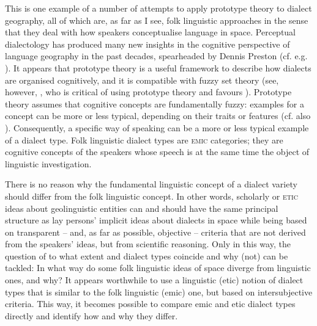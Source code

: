 \documentclass[output=paper]{LSP/langsci}
\begin{document}
This is one example of a number of attempts to apply prototype theory \citep{rosch_natural_1973,lakoff_women_1987} to dialect geography, all of which are, as far as I see, folk linguistic approaches \citep{christen_dialekt_1998,anders_was_2010,klausmann_wie_2006,kristiansen_style-shifting_2008,beeching_prototype-theoretic_2009} in the sense that they deal with how speakers conceptualise language in space. Perceptual dialectology has produced many new insights in the cognitive perspective of language geography in the past decades, spearheaded by Dennis Preston (cf. e.g. \citealt{preston_perceptual_1989,preston_handbook_1999,anders_perceptual_2010}). It appears that prototype theory is a useful framework to describe how dialects are organised cognitively, and it is compatible with fuzzy set theory (see, however, \citealt[218--250]{kretzschmar_linguistics_2009}, who is critical of using prototype theory and favours ). Prototype theory assumes that cognitive concepts are fundamentally fuzzy: examples for a concept can be more or less typical, depending on their traits or features (cf. also \citealt{bailey_boundaries_1973}). Consequently, a specific way of speaking can be a more or less typical example of a dialect type. Folk linguistic dialect types are \textsc{emic} categories; they are cognitive concepts of the speakers whose speech is at the same time the object of linguistic investigation.

There is no reason why the fundamental linguistic concept of a dialect variety should differ from the folk linguistic concept. In other words, scholarly or \textsc{etic} ideas about geolinguistic entities can and should have the same principal structure as lay persons’ implicit ideas about dialects in space while being based on transparent – and, as far as possible, objective – criteria that are not derived from the speakers’ ideas, but from scientific reasoning. Only in this way, the question of to what extent  and  dialect types coincide and why (not) can be tackled: In what way do some folk linguistic ideas of space diverge from linguistic ones, and why? It appears worthwhile to use a linguistic (etic) notion of dialect types that is similar to the folk linguistic (emic) one, but based on intersubjective criteria. This way, it becomes possible to compare emic and etic dialect types directly and identify how and why they differ. 
\end{document}
